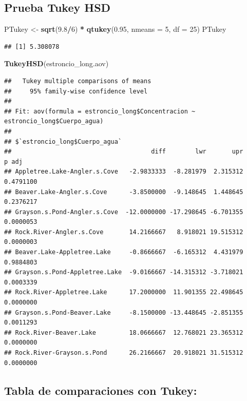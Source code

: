 \documentclass[
]{article}
\newenvironment{Shaded}{\begin{snugshade}}{\end{snugshade}}
\newcommand{\AttributeTok}[1]{\textcolor[rgb]{0.13,0.29,0.53}{#1}}
\newcommand{\DecValTok}[1]{\textcolor[rgb]{0.00,0.00,0.81}{#1}}
\newcommand{\FloatTok}[1]{\textcolor[rgb]{0.00,0.00,0.81}{#1}}
\newcommand{\FunctionTok}[1]{\textcolor[rgb]{0.13,0.29,0.53}{\textbf{#1}}}
\newcommand{\NormalTok}[1]{#1}
\newcommand{\OtherTok}[1]{\textcolor[rgb]{0.56,0.35,0.01}{#1}}
\newcommand{\SpecialCharTok}[1]{\textcolor[rgb]{0.81,0.36,0.00}{\textbf{#1}}}
\begin{document}
\subsection{Prueba Tukey HSD}\label{prueba-tukey-hsd}

\begin{Shaded}
\begin{Highlighting}[]
\NormalTok{PTukey }\OtherTok{\textless{}{-}} \FunctionTok{sqrt}\NormalTok{(}\FloatTok{9.8}\SpecialCharTok{/}\DecValTok{6}\NormalTok{) }\SpecialCharTok{*} \FunctionTok{qtukey}\NormalTok{(}\FloatTok{0.95}\NormalTok{, }\AttributeTok{nmeans =} \DecValTok{5}\NormalTok{, }\AttributeTok{df =} \DecValTok{25}\NormalTok{)}
\NormalTok{PTukey}
\end{Highlighting}
\end{Shaded}

\begin{verbatim}
## [1] 5.308078
\end{verbatim}

\begin{Shaded}
\begin{Highlighting}[]
\FunctionTok{TukeyHSD}\NormalTok{(estroncio\_long.aov)}
\end{Highlighting}
\end{Shaded}

\begin{verbatim}
##   Tukey multiple comparisons of means
##     95% family-wise confidence level
## 
## Fit: aov(formula = estroncio_long$Concentracion ~ estroncio_long$Cuerpo_agua)
## 
## $`estroncio_long$Cuerpo_agua`
##                                      diff        lwr       upr     p adj
## Appletree.Lake-Angler.s.Cove   -2.9833333  -8.281979  2.315312 0.4791100
## Beaver.Lake-Angler.s.Cove      -3.8500000  -9.148645  1.448645 0.2376217
## Grayson.s.Pond-Angler.s.Cove  -12.0000000 -17.298645 -6.701355 0.0000053
## Rock.River-Angler.s.Cove       14.2166667   8.918021 19.515312 0.0000003
## Beaver.Lake-Appletree.Lake     -0.8666667  -6.165312  4.431979 0.9884803
## Grayson.s.Pond-Appletree.Lake  -9.0166667 -14.315312 -3.718021 0.0003339
## Rock.River-Appletree.Lake      17.2000000  11.901355 22.498645 0.0000000
## Grayson.s.Pond-Beaver.Lake     -8.1500000 -13.448645 -2.851355 0.0011293
## Rock.River-Beaver.Lake         18.0666667  12.768021 23.365312 0.0000000
## Rock.River-Grayson.s.Pond      26.2166667  20.918021 31.515312 0.0000000
\end{verbatim}

\subsection{Tabla de comparaciones con
Tukey:}\label{tabla-de-comparaciones-con-tukey}
\end{document}
